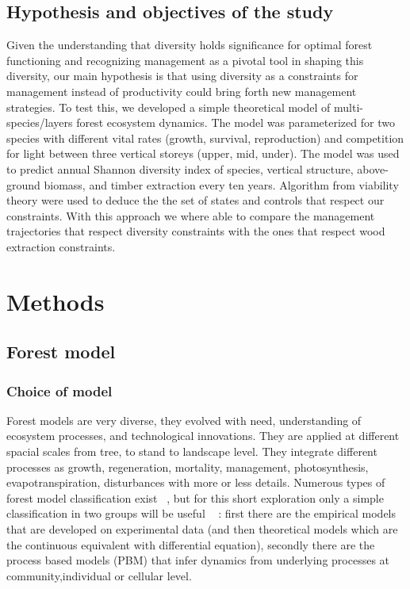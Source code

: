 \documentclass{article}
\begin{document}
\subsection{Hypothesis and objectives of the study}

Given the understanding that diversity holds significance for optimal forest functioning and recognizing management as a pivotal tool in shaping this diversity, our main hypothesis is that using diversity as a constraints for management instead of productivity could bring forth new management strategies. To test this, we developed a simple theoretical model of multi-species/layers forest ecosystem dynamics. The model was parameterized for two species with different vital rates (growth, survival, reproduction) and competition for light between three vertical storeys (upper, mid, under). The model was used to predict annual Shannon diversity index of species, vertical structure, above-ground biomass, and timber extraction every ten years.  Algorithm from viability theory were used to deduce the the set of states and controls that respect our constraints. With this approach we where able to compare the management trajectories that respect diversity constraints with the ones that respect wood extraction constraints.\\ 

\section{Methods}

\subsection{Forest model}
 
\subsubsection{Choice of model}

Forest models are very diverse, they evolved with need, understanding of ecosystem processes, and technological innovations. They are applied at different spacial scales from tree, to stand to landscape level. They integrate different processes as growth, regeneration, mortality, management, photosynthesis, evapotranspiration, disturbances with more or less details. Numerous types of forest model classification exist ~\autocite{porteModellingMixedForest2002}, but for this short exploration only a simple classification in two groups will be useful ~\autocite{fontesModelsSupportingForest2011} : first there are the empirical models that are developed on experimental data (and then theoretical models which are the continuous equivalent with differential equation), secondly there are the process based models (PBM) that infer dynamics from underlying processes at community,individual or cellular level. 
\end{document}
